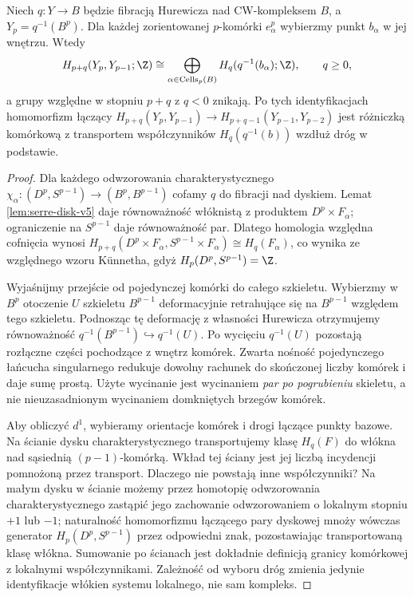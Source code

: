 \begin{lemat}
\label{lem:serre-cell-hurewicz-v6}
Niech $q:Y\to B$ będzie fibracją Hurewicza nad CW-kompleksem
$B$, a $Y_p=q^{-1}(B^p)$. Dla każdej zorientowanej
$p$-komórki $e^p_\alpha$ wybierzmy punkt $b_\alpha$ w jej
wnętrzu. Wtedy
\[
H_{p+q}(Y_p,Y_{p-1};\Z)\cong
\bigoplus_{\alpha\in\operatorname{Cells}_p(B)}
H_q(q^{-1}(b_\alpha);\Z),\qquad q\ge0,
\]
a grupy względne w stopniu $p+q$ z $q<0$ znikają.
Po tych identyfikacjach homomorfizm łączący
$H_{p+q}(Y_p,Y_{p-1})\to H_{p+q-1}(Y_{p-1},Y_{p-2})$
jest różniczką komórkową z transportem współczynników
$H_q(q^{-1}(b))$ wzdłuż dróg w podstawie.
\end{lemat}
\begin{proof}
Dla każdego odwzorowania charakterystycznego
$\chi_\alpha:(D^p,S^{p-1})\to(B^p,B^{p-1})$
cofamy $q$ do fibracji nad dyskiem. Lemat
\ref{lem:serre-disk-v5} daje równoważność włóknistą
z produktem $D^p\times F_\alpha$; ograniczenie na
$S^{p-1}$ daje równoważność par. Dlatego homologia
względna cofnięcia wynosi
$H_{p+q}(D^p\times F_\alpha,S^{p-1}\times F_\alpha)
\cong H_q(F_\alpha)$, co wynika ze względnego wzoru
Künnetha, gdyż $H_p(D^p,S^{p-1})=\Z$.

Wyjaśnijmy przejście od pojedynczej komórki do całego
szkieletu. Wybierzmy w $B^p$ otoczenie $U$ szkieletu
$B^{p-1}$ deformacyjnie retrahujące się na $B^{p-1}$
względem tego szkieletu. Podnosząc tę deformację
z własności Hurewicza otrzymujemy równoważność
$q^{-1}(B^{p-1})\hookrightarrow q^{-1}(U)$.
Po wycięciu $q^{-1}(U)$ pozostają rozłączne części
pochodzące z wnętrz komórek. Zwarta nośność pojedynczego
łańcucha singularnego redukuje dowolny rachunek do
skończonej liczby komórek i daje sumę prostą.
Użyte wycinanie jest wycinaniem \emph{par po pogrubieniu}
skieletu, a nie nieuzasadnionym wycinaniem domkniętych
brzegów komórek.

Aby obliczyć $d^1$, wybieramy orientacje komórek i drogi
łączące punkty bazowe. Na ścianie dysku
charakterystycznego transportujemy klasę $H_q(F)$ do
włókna nad sąsiednią $(p-1)$-komórką. Wkład tej ściany
jest jej liczbą incydencji pomnożoną przez transport.
Dlaczego nie powstają inne współczynniki?
Na małym dysku w ścianie możemy przez homotopię odwzorowania
charakterystycznego zastąpić jego zachowanie odwzorowaniem o lokalnym
stopniu $+1$ lub $-1$; naturalność homomorfizmu
łączącego pary dyskowej mnoży wówczas generator
$H_p(D^p,S^{p-1})$ przez odpowiedni znak, pozostawiając
transportowaną klasę włókna. Sumowanie po ścianach
jest dokładnie definicją granicy komórkowej z lokalnymi
współczynnikami. Zależność od wyboru dróg zmienia
jedynie identyfikacje włókien systemu lokalnego,
nie sam kompleks.
\end{proof}

